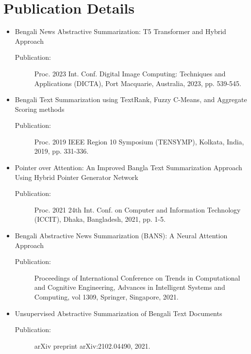 \documentclass[12pt]{report}
\begin{document}
\section*{Publication Details}
\begin{itemize}
    \item Bengali News Abstractive Summarization: T5 Transformer and Hybrid Approach \cite{hasib2023bengali}
        \begin{description}
            \item[Publication:] Proc. 2023 Int. Conf. Digital Image Computing: Techniques and Applications (DICTA), Port Macquarie, Australia, 2023, pp. 539-545.
        \end{description}
    \item Bengali Text Summarization using TextRank, Fuzzy C-Means, and Aggregate Scoring methods \cite{rahman2019bengali}
        \begin{description}
            \item[Publication:] Proc. 2019 IEEE Region 10 Symposium (TENSYMP), Kolkata, India, 2019, pp. 331-336.
        \end{description}
    \item Pointer over Attention: An Improved Bangla Text Summarization Approach Using Hybrid Pointer Generator Network \cite{dhar2021pointer}
        \begin{description}
            \item[Publication:] Proc. 2021 24th Int. Conf. on Computer and Information Technology (ICCIT), Dhaka, Bangladesh, 2021, pp. 1-5.
        \end{description}
    \item Bengali Abstractive News Summarization (BANS): A Neural Attention Approach \cite{bhattacharjee2021bengali}
        \begin{description}
            \item[Publication:] Proceedings of International Conference on Trends in Computational and Cognitive Engineering, Advances in Intelligent Systems and Computing, vol 1309, Springer, Singapore, 2021.
        \end{description}
    \item Unsupervised Abstractive Summarization of Bengali Text Documents \cite{chowdhury2021unsupervised}
        \begin{description}
            \item[Publication:] arXiv preprint arXiv:2102.04490, 2021.

\end{description}
\end{itemize}
\end{document}
